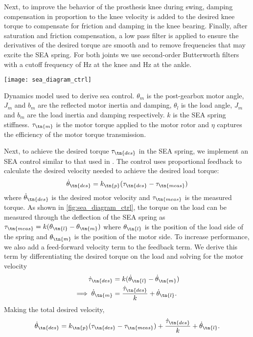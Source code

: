 Next, to improve the behavior of the prosthesis knee during swing, damping
compensation in proportion to the knee velocity is added to the desired knee
torque to compensate for friction and damping in the knee bearing. Finally,
after saturation and friction compensation, a low pass filter is applied to
ensure the derivatives of the desired torque are smooth and to remove
frequencies that may excite the SEA spring. For both joints we use second-order
Butterworth filters with a cutoff frequency of \unit[25]{Hz} at the knee and
\unit[20]{Hz} at the ankle.

\begin{marginfigure}[-0.0in]
    \centering 
    \texttt{[image: sea\_diagram\_ctrl]}
    \caption[Dynamics model used to derive sea control]{Dynamics model used to
    derive sea control. $\theta_m$ is the post-gearbox motor angle, $J_m$ and
    $b_m$ are the reflected motor inertia and damping, $\theta_l$ is the load
    angle, $J_m$ and $b_m$ are the load inertia and damping respectively. $k$ is
    the SEA spring stiffness.  $\tau_\tn{m}$ is the motor torque applied to the
    motor rotor and $\eta$ captures the efficiency of the motor torque
    transmission.}\label{fig:sea_diagram_ctrl}
\end{marginfigure}
Next, to achieve the desired torque $\tau_\tn{des}$ in the SEA spring, we
implement an SEA control similar to that used in
\citet{schepelmann2012development}. The control uses proportional feedback to
calculate the desired velocity needed to achieve the desired load torque:
\begin{align}
    \dot \theta_\tn{des} = k_\tn{p} (\tau_\tn{des} - \tau_\tn{meas})
\end{align}
where $\dot \theta_\tn{des}$ is the desired motor velocity and $\tau_\tn{meas}$
is the measured torque. As shown in \cref{fig:sea_diagram_ctrl}, the torque on
the load can be measured through the deflection of the SEA spring as
$\tau_\tn{meas} = k (\theta_\tn{l} - \theta_\tn{m})$ where $\theta_\tn{l}$ is
the position of the load side of the spring and $\theta_\tn{m}$ is the position
of the motor side. To increase performance, we also add a feed-forward velocity
term to the feedback term. We derive this term by differentiating the desired
torque on the load and solving for the motor velocity
\begin{align}
    \dot \tau_\tn{des} &= k (\dot \theta_\tn{l} - \dot \theta_\tn{m}) \\
    \implies \dot \theta_\tn{m} &= \frac{\dot \tau_\tn{des}}{k} 
        + \dot \theta_\tn{l}.\label{eq:motor_vel_from_tau_des}
\end{align}
Making the total desired velocity,
\begin{align}
    \dot \theta_\tn{des} = k_\tn{p} (\tau_\tn{des} - \tau_\tn{meas}) 
        + \frac{\dot \tau_\tn{des}}{k} + \dot \theta_\tn{l}.
\end{align}

